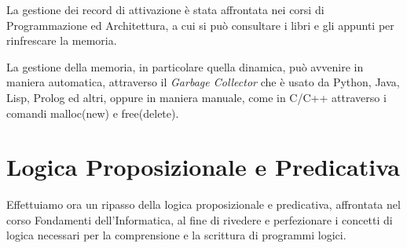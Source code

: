 \documentclass[a4paper]{report}
\begin{document}
La gestione dei record di attivazione è stata affrontata nei corsi di Programmazione ed Architettura, a cui si può consultare i
libri e gli appunti per rinfrescare la memoria.

La gestione della memoria, in particolare quella dinamica, può avvenire in maniera automatica, attraverso il \emph{Garbage Collector} che è
usato da Python, Java, Lisp, Prolog ed altri, oppure in maniera manuale, come in C/C++ attraverso i comandi malloc(new) e free(delete).

\chapter{Logica Proposizionale e Predicativa}
Effettuiamo ora un ripasso della logica proposizionale e predicativa, affrontata nel corso Fondamenti dell'Informatica, al fine di rivedere
e perfezionare i concetti di logica necessari per la comprensione e la scrittura di programmi logici.
\end{document}
